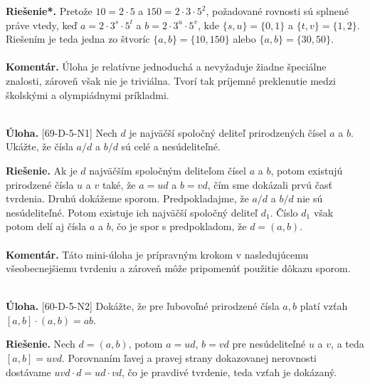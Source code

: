 \documentclass[11pt,a4paper,oneside,final]{book}
\newcommand{\kom}{\textbf{Komentár.} }
\newcommand{\ul}{\textbf{Úloha.} }
\newcommand{\rie}{\textbf{Riešenie.} }
\newcommand{\rieh}{\textbf{Riešenie*.} }
\begin{document}
\rieh Pretože $10 = 2 \cdot 5$ a $150 = 2 \cdot 3 \cdot 5^2$, požadované rovnosti sú splnené práve vtedy, keď $a = 2 \cdot 3^s \cdot 5^t$ a $b = 2 \cdot 3^u \cdot 5^v$, kde $\{s, u\} = \{0, 1\}$ a $\{t, v\} = \{1, 2\}$. Riešením je teda jedna zo štvoríc $\{a, b\} = \{10, 150\}$ alebo $\{a, b\} = \{30, 50\}$.\\
\\
\kom Úloha je relatívne jednoduchá a nevyžaduje žiadne špeciálne znalosti, zároveň však nie je triviálna. Tvorí tak príjemné preklenutie medzi školskými a olympiádnymi príkladmi.\\
\\
\begin{tcolorbox}[breakable,notitle,boxrule=0pt,colback=light-gray,colframe=light-gray]\ul [69-D-5-N1] Nech $d$ je najväčší spoločný deliteľ prirodzených čísel $a$ a $b$. Ukážte, že čísla $a/d$ a $b/d$ sú celé a nesúdeliteľné.

\end{tcolorbox}

\rie Ak je $d$ najväčším spoločným deliteľom čísel $a$ a $b$, potom existujú prirodzené čísla $u$ a $v$ také, že $a=ud$ a $b=vd$, čím sme dokázali prvú časť tvrdenia. Druhú dokážeme sporom. Predpokladajme, že $a/d$ a $b/d$ nie sú nesúdeliteľné. Potom existuje ich najväčší spoločný deliteľ $d_1$. Číslo $d_1$ však potom delí aj čísla $a$ a $b$, čo je spor s predpokladom, že $d=(a,b)$.\\
\\
\kom Táto mini-úloha je prípravným krokom v nasledujúcemu všeobecnejšiemu tvrdeniu a zároveň môže pripomenúť použitie dôkazu sporom.\\
\\
\begin{tcolorbox}[breakable,notitle,boxrule=0pt,colback=light-gray,colframe=light-gray]\ul [60-D-5-N2] Dokážte, že pre ľubovoľné prirodzené čísla $a, b$ platí vzťah $[a, b] \cdot (a, b) = ab$.

\end{tcolorbox}

\rie Nech $d = (a, b)$, potom $a = ud$, $b = vd$ pre nesúdeliteľné $u$ a $v$, a teda $[a, b] = uvd$. Porovnaním ľavej a pravej strany dokazovanej nerovnosti dostávame $uvd\cdot d = ud\cdot vd$, čo je pravdivé tvrdenie, teda vzťah je dokázaný.
\end{document}
